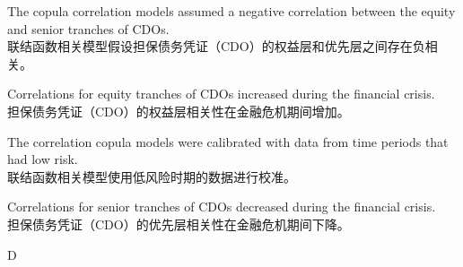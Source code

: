 \documentclass{article}
\begin{document}
\begin{choices}
    \item The copula correlation models assumed a negative correlation between the equity and senior tranches of CDOs.\\
        联结函数相关模型假设担保债务凭证（CDO）的权益层和优先层之间存在负相关。
    \item Correlations for equity tranches of CDOs increased during the financial crisis.\\
        担保债务凭证（CDO）的权益层相关性在金融危机期间增加。
    \item The correlation copula models were calibrated with data from time periods that had low risk.\\
        联结函数相关模型使用低风险时期的数据进行校准。
    \item Correlations for senior tranches of CDOs decreased during the financial crisis.\\
        担保债务凭证（CDO）的优先层相关性在金融危机期间下降。
\end{choices}

\begin{correctanswer}
    D
\end{correctanswer}
\end{document}
